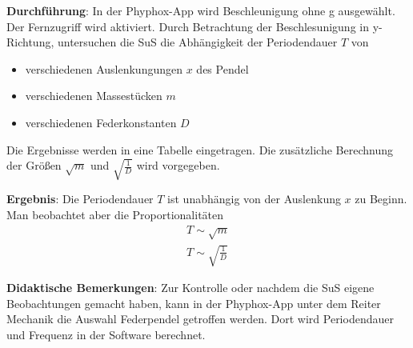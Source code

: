 \documentclass[../main.tex]{subfiles}
\begin{document}
\begin{tcolorbox}
    \vspace{0.5cm}
    \textbf{Durchführung}: In der Phyphox-App wird \glqq Beschleunigung ohne g\grqq{} ausgewählt. Der Fernzugriff wird aktiviert. Durch Betrachtung der Beschlesunigung in y-Richtung, untersuchen die SuS die Abhängigkeit der Periodendauer $T$ von
    \begin{itemize}[noitemsep]
        \item verschiedenen Auslenkungungen $x$ des Pendel
        \item verschiedenen Massestücken $m$
        \item verschiedenen Federkonstanten $D$
    \end{itemize}
    Die Ergebnisse werden in eine Tabelle eingetragen. Die zusätzliche Berechnung der Größen $\sqrt{m}$ und $\sqrt{\frac{1}{D}}$ wird vorgegeben.

    \vspace{0.5cm}
    \textbf{Ergebnis}: Die Periodendauer $T$ ist unabhängig von der Auslenkung $x$ zu Beginn. Man beobachtet aber die Proportionalitäten
    \begin{align*}
        T \sim \sqrt{m} \\
        T \sim \sqrt{\frac{1}{D}}
    \end{align*}
    
    \vspace{0.5cm}
    \textbf{Didaktische Bemerkungen}: Zur Kontrolle oder nachdem die SuS eigene Beobachtungen gemacht haben, kann in der Phyphox-App unter dem Reiter \glqq Mechanik \grqq{} die Auswahl \glqq Federpendel \grqq{} getroffen werden. Dort wird Periodendauer und Frequenz in der Software berechnet.   
     
\end{tcolorbox}
\end{document}

